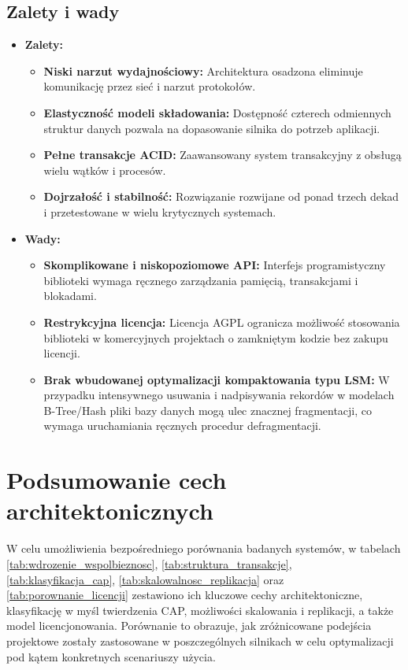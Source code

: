 \subsection{Zalety i wady}
\begin{itemize}
    \item \textbf{Zalety:}
    \begin{itemize}
        \item \textbf{Niski narzut wydajnościowy:} Architektura osadzona eliminuje komunikację przez sieć i narzut protokołów.
        \item \textbf{Elastyczność modeli składowania:} Dostępność czterech odmiennych struktur danych pozwala na dopasowanie silnika do potrzeb aplikacji.
        \item \textbf{Pełne transakcje ACID:} Zaawansowany system transakcyjny z obsługą wielu wątków i procesów.
        \item \textbf{Dojrzałość i stabilność:} Rozwiązanie rozwijane od ponad trzech dekad i przetestowane w wielu krytycznych systemach.
    \end{itemize}
    \item \textbf{Wady:}
    \begin{itemize}
        \item \textbf{Skomplikowane i niskopoziomowe API:} Interfejs programistyczny biblioteki wymaga ręcznego zarządzania pamięcią, transakcjami i blokadami.
        \item \textbf{Restrykcyjna licencja:} Licencja AGPL ogranicza możliwość stosowania biblioteki w komercyjnych projektach o zamkniętym kodzie bez zakupu licencji.
        \item \textbf{Brak wbudowanej optymalizacji kompaktowania typu LSM:} W przypadku intensywnego usuwania i nadpisywania rekordów w modelach B-Tree/Hash pliki bazy danych mogą ulec znacznej fragmentacji, co wymaga uruchamiania ręcznych procedur defragmentacji.
    \end{itemize}
\end{itemize}

\section{Podsumowanie cech architektonicznych}
W celu umożliwienia bezpośredniego porównania badanych systemów, w tabelach \ref{tab:wdrozenie_wspolbieznosc}, \ref{tab:struktura_transakcje}, \ref{tab:klasyfikacja_cap}, \ref{tab:skalowalnosc_replikacja} oraz \ref{tab:porownanie_licencji} zestawiono ich kluczowe cechy architektoniczne, klasyfikację w myśl twierdzenia CAP, możliwości skalowania i replikacji, a także model licencjonowania. Porównanie to obrazuje, jak zróżnicowane podejścia projektowe zostały zastosowane w poszczególnych silnikach w celu optymalizacji pod kątem konkretnych scenariuszy użycia.

